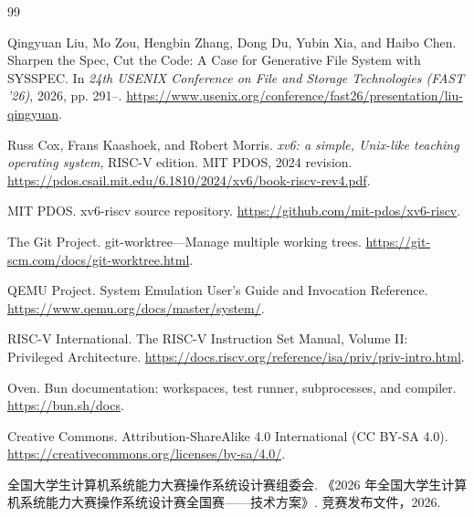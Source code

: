 
\begin{thebibliography}{99}

Qingyuan Liu, Mo Zou, Hengbin Zhang, Dong Du, Yubin Xia, and Haibo Chen.
\newblock Sharpen the Spec, Cut the Code: A Case for Generative File System with SYSSPEC.
\newblock In \emph{24th USENIX Conference on File and Storage Technologies (FAST '26)}, 2026, pp. 291--.
\newblock \url{https://www.usenix.org/conference/fast26/presentation/liu-qingyuan}.

Russ Cox, Frans Kaashoek, and Robert Morris.
\newblock \emph{xv6: a simple, Unix-like teaching operating system}, RISC-V edition.
\newblock MIT PDOS, 2024 revision.
\newblock \url{https://pdos.csail.mit.edu/6.1810/2024/xv6/book-riscv-rev4.pdf}.

MIT PDOS.
\newblock xv6-riscv source repository.
\newblock \url{https://github.com/mit-pdos/xv6-riscv}.

The Git Project.
\newblock git-worktree---Manage multiple working trees.
\newblock \url{https://git-scm.com/docs/git-worktree.html}.

QEMU Project.
\newblock System Emulation User's Guide and Invocation Reference.
\newblock \url{https://www.qemu.org/docs/master/system/}.

RISC-V International.
\newblock The RISC-V Instruction Set Manual, Volume II: Privileged Architecture.
\newblock \url{https://docs.riscv.org/reference/isa/priv/priv-intro.html}.

Oven.
\newblock Bun documentation: workspaces, test runner, subprocesses, and compiler.
\newblock \url{https://bun.sh/docs}.

Creative Commons.
\newblock Attribution-ShareAlike 4.0 International (CC BY-SA 4.0).
\newblock \url{https://creativecommons.org/licenses/by-sa/4.0/}.

全国大学生计算机系统能力大赛操作系统设计赛组委会.
\newblock 《2026 年全国大学生计算机系统能力大赛操作系统设计赛全国赛——技术方案》.
\newblock 竞赛发布文件，2026.

\end{thebibliography}
